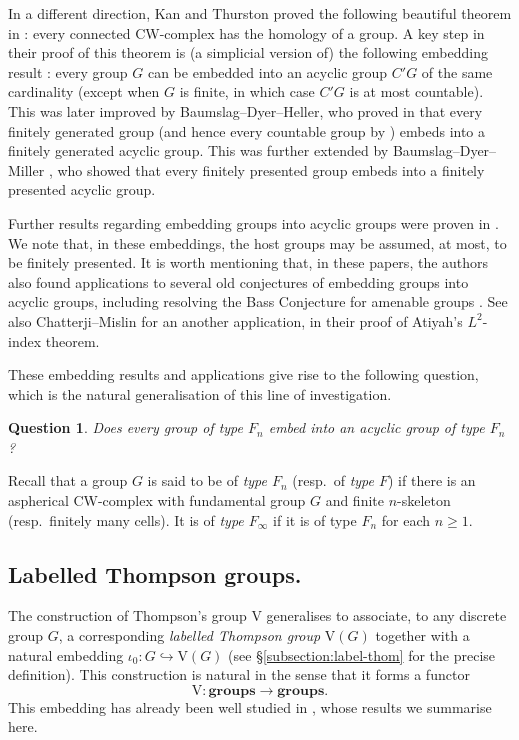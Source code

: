 \documentclass[10pt,a4paper]{amsart}
\numberwithin{equation}{section}
\numberwithin{figure}{section}
\newtheorem{ques}[thm]{Question}
\theoremstyle{definition}
\newcommand{\V}{\mathrm{V}}
\renewcommand{\geq}{\geqslant}
\begin{document}
In a different direction, Kan and Thurston proved the following beautiful theorem in \cite{KanThurston76}: every connected CW-complex has the homology of a group. A key step in their proof of this theorem is (a simplicial version of) the following embedding result \cite[Proposition 3.3]{KanThurston76}: every group $G$ can be embedded into an acyclic group $C'G$ of the same cardinality (except when $G$ is finite, in which case $C'G$ is at most countable). This was later improved by Baumslag--Dyer--Heller, who proved in \cite{BauDyHe80} that every finitely generated group (and hence every countable group by \cite[Theorem IV]{HigmanNeumannNeumann49}) embeds into a finitely generated acyclic group. This was further extended by Baumslag--Dyer--Miller \cite{BauDyMi83}, who showed that every finitely presented group embeds into a finitely presented acyclic group.

Further results regarding embedding groups into acyclic groups were proven in \cite{BerrickMiller92, BerrickChatterjiMislin04, Berrick11}. We note that, in these embeddings, the host groups may be assumed, at most, to be finitely presented. It is worth mentioning that, in these papers, the authors also found applications to several old conjectures of embedding groups into acyclic groups, including resolving the Bass Conjecture for amenable groups \cite[Theorem 1.2]{BerrickChatterjiMislin04}. See also Chatterji--Mislin \cite{ChatterjiMislin03} for an another application, in their proof of Atiyah's $L^2$-index theorem.

These embedding results and applications give rise to the following question, which is the natural generalisation of this line of investigation.

\begin{ques}
\label{ques:acyclic-emb-F_n}
Does every group of type $F_n$ embed into an acyclic group of type $F_n$?
\end{ques}

Recall that a group $G$ is said to be of \emph{type $F_n$} (resp.\ of \emph{type $F$}) if there is an aspherical CW-complex with fundamental group $G$ and finite $n$-skeleton (resp.\ finitely many cells). It is of \emph{type $F_\infty$} if it is of type $F_n$ for each $n\geq 1$. 


\subsection*{Labelled Thompson groups.}

The construction of Thompson's group $\V$ generalises to associate, to any discrete group $G$, a corresponding \emph{labelled Thompson group} $\V(G)$ together with a natural embedding $\iota_0 \colon G \hookrightarrow \V(G)$ (see \S\ref{subsection:label-thom} for the precise definition). This construction is natural in the sense that it forms a functor
\begin{equation*}
\V \colon \mathbf{groups} \longrightarrow \mathbf{groups}.
\end{equation*}
This embedding has already been well studied in \cite{Thompson80, WuWuZhaoZhou2025}, whose results we summarise here.
\end{document}
